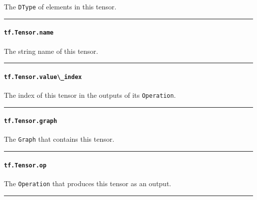 The \lstinline{DType} of elements in this tensor.

\begin{center}\rule{0.5\linewidth}{\linethickness}\end{center}

\paragraph{\texorpdfstring{\lstinline{tf.Tensor.name}
}{tf.Tensor.name }}\label{tf.tensor.name}

The string name of this tensor.

\begin{center}\rule{0.5\linewidth}{\linethickness}\end{center}

\paragraph{\texorpdfstring{\lstinline{tf.Tensor.value\_index}
}{tf.Tensor.value\_index }}\label{tf.tensor.valueux5findex}

The index of this tensor in the outputs of its \lstinline{Operation}.

\begin{center}\rule{0.5\linewidth}{\linethickness}\end{center}

\paragraph{\texorpdfstring{\lstinline{tf.Tensor.graph}
}{tf.Tensor.graph }}\label{tf.tensor.graph}

The \lstinline{Graph} that contains this tensor.

\begin{center}\rule{0.5\linewidth}{\linethickness}\end{center}

\paragraph{\texorpdfstring{\lstinline{tf.Tensor.op}
}{tf.Tensor.op }}\label{tf.tensor.op}

The \lstinline{Operation} that produces this tensor as an output.

\begin{center}\rule{0.5\linewidth}{\linethickness}\end{center}

